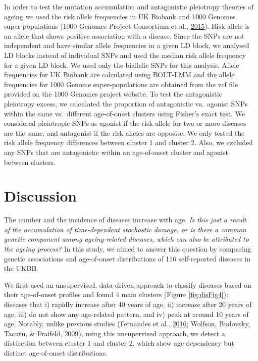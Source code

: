 \documentclass[12pt,twoside]{unicam}
\begin{document}
In order to test the mutation accumulation and antagonistic pleiotropy theories of ageing we used the risk allele frequencies in UK Biobank and 1000 Genomes super-populations (1000 Genomes Project Consortium et al., \protect\hyperlink{ref-1000_Genomes_Project_Consortium2015}{2015}). Risk allele is an allele that shows positive association with a disease. Since the SNPs are not independent and have similar allele frequencies in a given LD block, we analysed LD blocks instead of individual SNPs and used the median risk allele frequency for a given LD block. We used only the biallelic SNPs for this analysis. Allele frequencies for UK Biobank are calculated using BOLT-LMM and the allele frequencies for 1000 Genome super-populations are obtained from the vcf file provided on the 1000 Genomes project website. To test the antagonistic pleiotropy excess, we calculated the proportion of antagonistic vs.~agonist SNPs within the same vs.~different age-of-onset clusters using Fisher's exact test. We considered pleiotropic SNPs as agonist if the risk allele for two or more diseases are the same, and antagonist if the risk alleles are opposite. We only tested the risk allele frequency differences between cluster 1 and cluster 2. Also, we excluded any SNPs that are antagonistic within an age-of-onset cluster and agonist between clusters.

\hypertarget{discussion-1}{%
\section{Discussion}\label{discussion-1}}

The number and the incidence of diseases increase with age. \emph{Is this just a result of the accumulation of time-dependent stochastic damage, or is there a common genetic component among ageing-related diseases, which can also be attributed to the ageing process?} In this study, we aimed to answer this question by comparing genetic associations and age-of-onset distributions of 116 self-reported diseases in the UKBB.

We first used an unsupervised, data-driven approach to classify diseases based on their age-of-onset profiles and found 4 main clusters (Figure \ref{fig:disFig4}); diseases that i) rapidly increase after 40 years of age, ii) increase after 20 years of age, iii) do not show any age-related pattern, and iv) peak at around 10 years of age. Notably, unlike previous studies (Fernandes et al., \protect\hyperlink{ref-Fernandes2016}{2016}; Wolfson, Budovsky, Tacutu, \& Fraifeld, \protect\hyperlink{ref-Wolfson2009}{2009}), using this unsupervised approach, we detect a distinction between cluster 1 and cluster 2, which show age-dependency but distinct age-of-onset distributions.
\end{document}
